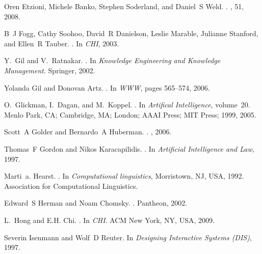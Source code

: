 \documentclass{www2010-accepted}
\begin{document}
\begin{thebibliography}{10}
Oren Etzioni, Michele Banko, Stephen Soderland, and Daniel~S Weld.
.
, 51, 2008.

B~J Fogg, Cathy Soohoo, David~R Danielson, Leslie Marable, Julianne Stanford,
  and Ellen~R Tauber.
.
\newblock In {\em CHI}, 2003.

Y.~Gil and V.~Ratnakar.
.
\newblock In {\em Knowledge Engineering and Knowledge Management}. Springer,
  2002.

Yolanda Gil and Donovan Artz.
.
\newblock In {\em WWW}, pages 565--574, 2006.

O.~Glickman, I.~Dagan, and M.~Koppel.
.
\newblock In {\em Artifical Intelligence}, volume~20. Menlo Park, CA;
  Cambridge, MA; London; AAAI Press; MIT Press; 1999, 2005.

Scott~A Golder and Bernardo~A Huberman.
.
, 2006.

Thomas~F Gordon and Nikos Karacapilidis.
.
\newblock In {\em Artificial Intelligence and Law}, 1997.

Marti~a. Hearst.
.
\newblock In {\em Computational linguistics}, Morristown, NJ, USA, 1992.
  Association for Computational Linguistics.

Edward~S Herman and Noam Chomsky.
.
\newblock Pantheon, 2002.

L.~Hong and E.H. Chi.
.
\newblock In {\em CHI}. ACM New York, NY, USA, 2009.

Severin Isenmann and Wolf~D Reuter.
\newblock In {\em Designing Interactive Systems (DIS)}, 1997.


\end{thebibliography}
\end{document}
